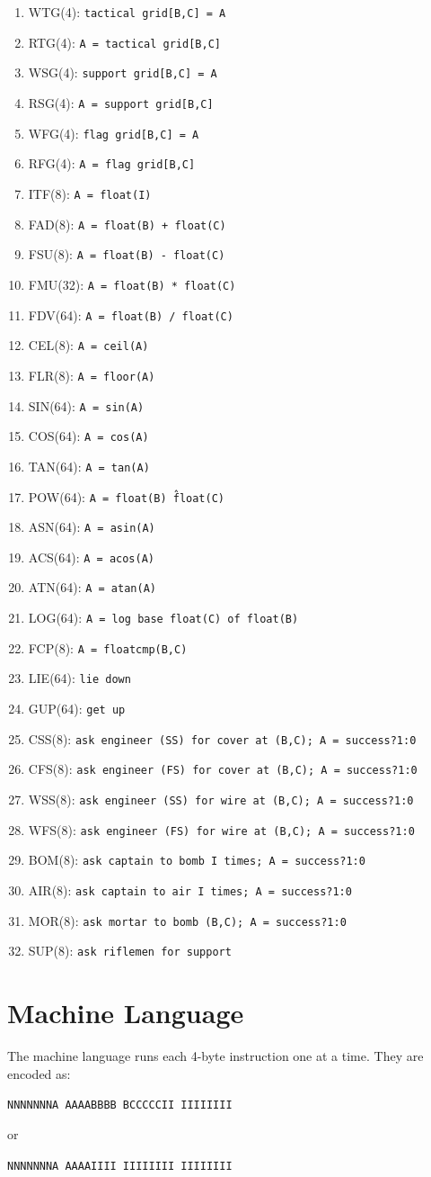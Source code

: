 \documentclass{article}
\begin{document}
\begin{enumerate}[noitemsep]
    \item WTG(4): \texttt{tactical grid[B,C] = A}
    \item RTG(4): \texttt{A = tactical grid[B,C]}
    \item WSG(4): \texttt{support grid[B,C] = A}
    \item RSG(4): \texttt{A = support grid[B,C]}
    \item WFG(4): \texttt{flag grid[B,C] = A}
    \item RFG(4): \texttt{A = flag grid[B,C]}
    \item ITF(8): \texttt{A = float(I)}
    \item FAD(8): \texttt{A = float(B) + float(C)}
    \item FSU(8): \texttt{A = float(B) - float(C)}
    \item FMU(32): \texttt{A = float(B) * float(C)}
    \item FDV(64): \texttt{A = float(B) / float(C)}
    \item CEL(8): \texttt{A = ceil(A)}
    \item FLR(8): \texttt{A = floor(A)}
    \item SIN(64): \texttt{A = sin(A)}
    \item COS(64): \texttt{A = cos(A)}
    \item TAN(64): \texttt{A = tan(A)}
    \item POW(64): \texttt{A = float(B) \^ float(C)}
    \item ASN(64): \texttt{A = asin(A)}
    \item ACS(64): \texttt{A = acos(A)}
    \item ATN(64): \texttt{A = atan(A)}
    \item LOG(64): \texttt{A = log base float(C) of float(B)}
    \item FCP(8): \texttt{A = floatcmp(B,C)}
    \item LIE(64): \texttt{lie down}
    \item GUP(64): \texttt{get up}
    \item CSS(8): \texttt{ask engineer (SS) for cover at (B,C); A = success?1:0}
    \item CFS(8): \texttt{ask engineer (FS) for cover at (B,C); A = success?1:0}
    \item WSS(8): \texttt{ask engineer (SS) for wire at (B,C); A = success?1:0}
    \item WFS(8): \texttt{ask engineer (FS) for wire at (B,C); A = success?1:0}
    \item BOM(8): \texttt{ask captain to bomb I times; A = success?1:0}
    \item AIR(8): \texttt{ask captain to air I times; A = success?1:0}
    \item MOR(8): \texttt{ask mortar to bomb (B,C); A = success?1:0}
    \item SUP(8): \texttt{ask riflemen for support}
\end{enumerate}

\section*{Machine Language}

The machine language runs each 4-byte instruction one at a time. They are
encoded as:

\texttt{NNNNNNNA AAAABBBB BCCCCCII IIIIIIII}

or

\texttt{NNNNNNNA AAAAIIII IIIIIIII IIIIIIII}
\end{document}
